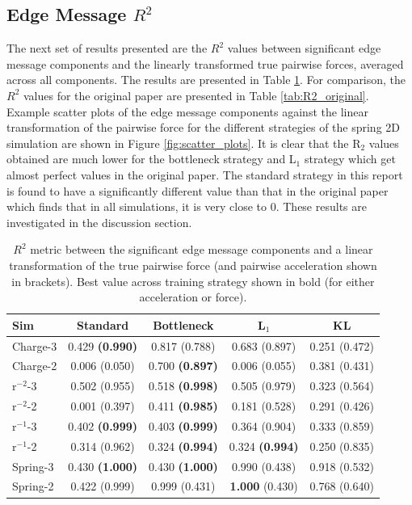 \documentclass[11pt]{article}
\begin{document}
\subsection{Edge Message $R^2$}
The next set of results presented are the $R^2$ values between significant edge message components and the linearly transformed true pairwise forces, averaged across all components. The results are presented in Table \ref{tab:R2}. For comparison, the $R^2$ values for the original paper are presented in Table \ref{tab:R2_original}. Example scatter plots of the edge message components against the linear transformation of the pairwise force for the different strategies of the spring 2D simulation are shown in Figure \ref{fig:scatter_plots}. It is clear that the R$_{2}$ values obtained are much lower for the bottleneck strategy and L$_{1}$ strategy which get almost perfect values in the original paper. The standard strategy in this report is found to have a significantly different value than that in the original paper which finds that in all simulations, it is very close to 0. These results are investigated in the discussion section.
    \begin{table}[H]
        \centering
        \begin{tabular}{lcccc}
        \hline
        Sim & Standard & Bottleneck & L$_1$ & KL \\
        \hline
        Charge-3 & 0.429 \textbf{(0.990)} & 0.817 (0.788) & 0.683 (0.897) & 0.251 (0.472) \\
        Charge-2 & 0.006 (0.050) & 0.700 \textbf{(0.897)} & 0.006 (0.055) & 0.381 (0.431)\\
        r$^{-2}$-3 & 0.502 (0.955) & 0.518 \textbf{(0.998)} & 0.505 (0.979) & 0.323 (0.564) \\
        r$^{-2}$-2 & 0.001 (0.397) & 0.411 \textbf{(0.985)} & 0.181 (0.528) & 0.291 (0.426) \\
        r$^{-1}$-3 & 0.402 \textbf{(0.999)} & 0.403 \textbf{(0.999)} & 0.364 (0.904) & 0.333 (0.859)\\
        r$^{-1}$-2 & 0.314 (0.962) & 0.324 \textbf{(0.994)} & 0.324 \textbf{(0.994)} & 0.250 (0.835) \\
        Spring-3 & 0.430 \textbf{(1.000)}& 0.430 \textbf{(1.000)} & 0.990 (0.438) & 0.918 (0.532)\\
        Spring-2 & 0.422 (0.999) & 0.999 (0.431) & \textbf{1.000} (0.430) & 0.768 (0.640) \\

        \hline
        \end{tabular}
        \caption{$R^2$ metric between the significant edge message components and a linear transformation of the true pairwise force (and pairwise acceleration shown in brackets). Best value across training strategy shown in bold (for either acceleration or force).}
        \label{tab:R2}
    \end{table}
\end{document}
